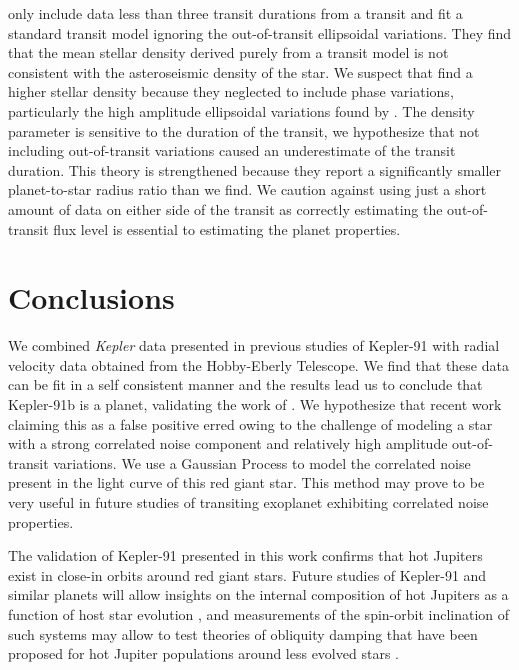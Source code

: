 \documentclass[apjl]{emulateapj}
\begin{document}
\citet{sliski14} only include data less than three transit durations from a transit and fit a standard transit model ignoring the out-of-transit ellipsoidal variations. They find that the mean stellar density derived purely from a transit model is not consistent with the asteroseismic density of the star. We suspect that \citeauthor{sliski14} find a higher stellar density because they neglected to include phase variations, particularly the high amplitude ellipsoidal variations found by \citet{lillo14}. The density parameter is sensitive to the duration of the transit, we hypothesize that not including out-of-transit variations caused an underestimate of the transit duration. This theory is strengthened because they report a significantly smaller planet-to-star radius ratio than we find. We caution against using just a short amount of data on either side of the transit as correctly estimating the out-of-transit flux level is essential to estimating the planet properties.





\section{Conclusions}
We combined \emph{Kepler} data presented in previous studies of Kepler-91 with radial velocity data obtained from the Hobby-Eberly Telescope. We find that these data can be fit in a self consistent manner and the results lead us to conclude that Kepler-91b is a planet, validating the work of \citet{lillo14}. We hypothesize that recent work claiming this as a false positive erred owing to the challenge of modeling a star with a strong correlated noise component and relatively high amplitude out-of-transit variations. We use a Gaussian Process to model the correlated noise present in the light curve of this red giant star. This method may prove to be very useful in future studies of transiting exoplanet exhibiting correlated noise properties.

The validation of Kepler-91 presented in this work confirms that hot Jupiters exist in close-in orbits around red giant stars. Future studies of Kepler-91 and similar planets will allow insights on the internal composition of hot Jupiters as a function of host star evolution \citep{spiegel12}, and measurements of the spin-orbit inclination of such systems may allow to test theories of obliquity damping that have been proposed for hot Jupiter populations around less evolved stars \citep{winn10}.
\end{document}
